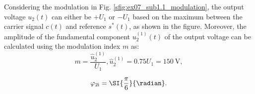 \begin{solutionblock}
    Considering the modulation in Fig. \ref{sfig:ex07_sub1.1_modulation}, the output voltage $u_\mathrm{2}(t)$ can either be $+U_1$ or $-U_1$ based on
    the maximum between the carrier signal $c(t)$ and reference $s^{*}(t)$, as shown in the figure. Moreover, the amplitude of the fundamental component $u^\mathrm{(1)}_\mathrm{2}(t)$ of the output voltage can be calculated using the modulation
    index $m$ as:
    \begin{equation}
        m = \frac{\hat{u}^\mathrm{(1)}_\mathrm{2}}{U_{\mathrm{1}}}, \hat{u}^\mathrm{(1)}_\mathrm{2} = 0.75 U_{\mathrm{1}} =  \SI{150}{\volt},
        \label{7.1.1:eq:mag_u2_fund}         
    \end{equation}

    \begin{equation}
        \varphi_{2\mathrm{i}} = \SI{\frac{\pi}{6}}{\radian}.
        \label{7.1.1:eq:varphi_2i}         
    \end{equation}
\end{solutionblock}



